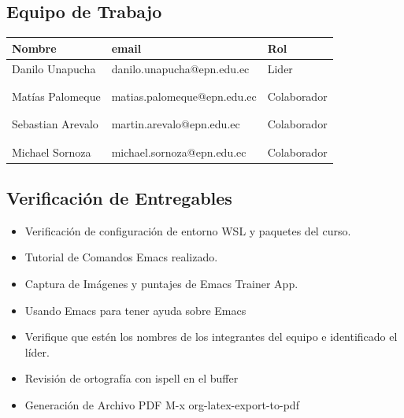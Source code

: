 \documentclass[11pt]{article}
\begin{document}
\subsection{Equipo de Trabajo}
\label{sec:org2274a0b}
\begin{center}
\begin{tabular}{lll}
Nombre & email & Rol\\[0pt]
\hline
Danilo Unapucha & danilo.unapucha@epn.edu.ec & Lider\\[0pt]
 &  & \\[0pt]
 &  & \\[0pt]
Matías Palomeque & matias.palomeque@epn.edu.ec & Colaborador\\[0pt]
 &  & \\[0pt]
 &  & \\[0pt]
Sebastian Arevalo & martin.arevalo@epn.edu.ec & Colaborador\\[0pt]
 &  & \\[0pt]
 &  & \\[0pt]
Michael Sornoza & michael.sornoza@epn.edu.ec & Colaborador\\[0pt]
\end{tabular}
\end{center}


\subsection{Verificación de Entregables}
\label{sec:orge592dc4}
\begin{itemize}
\item[{$\boxtimes$}] Verificación de configuración de entorno WSL y paquetes del curso.
\item[{$\boxtimes$}] Tutorial de Comandos Emacs realizado.
\item[{$\boxtimes$}] Captura de Imágenes y puntajes de Emacs Trainer App.
\item[{$\boxtimes$}] Usando Emacs para tener ayuda sobre Emacs
\item[{$\boxtimes$}] Verifique que estén los nombres de los integrantes del equipo e identificado el líder.
\item[{$\boxtimes$}] Revisión de ortografía con ispell en el buffer
\item[{$\boxtimes$}] Generación de Archivo PDF M-x org-latex-export-to-pdf
\end{itemize}
\end{document}
